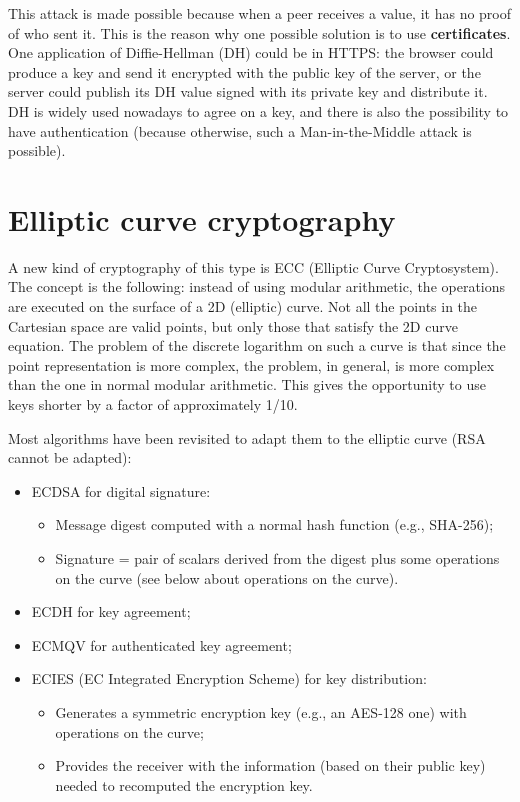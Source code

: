 This attack is made possible because when a peer receives a value, it has no proof of who sent it.
This is the reason why one possible solution is to use \textbf{certificates}. %
One application of Diffie-Hellman (DH) could be in HTTPS: the browser could produce a key and send it encrypted with the public key of the server, or the server could publish its DH value signed with its private key and distribute it.
DH is widely used nowadays to agree on a key, and there is also the possibility to have authentication (because otherwise, such a Man-in-the-Middle attack is possible).


\section{Elliptic curve cryptography}
A new kind of cryptography of this type is ECC (Elliptic Curve Cryptosystem). The concept is the following: instead of using modular arithmetic, the operations are executed on the surface of a 2D (elliptic) curve. Not all the points in the Cartesian space are valid points, but only those that satisfy the 2D curve equation. The problem of the discrete logarithm on such a curve is that since the point representation is more complex, the problem, in general, is more complex than the one in normal modular arithmetic. This gives the opportunity to use keys shorter by a factor of approximately 1/10.

Most algorithms have been revisited to adapt them to the elliptic curve (RSA cannot be adapted):
\begin{itemize}
    \item ECDSA for digital signature:
          \begin{itemize}
              \item Message digest computed with a normal hash function (e.g., SHA-256);
              \item Signature = pair of scalars derived from the digest plus some operations on the curve (see below about operations on the curve).
          \end{itemize}
    \item ECDH for key agreement;
    \item ECMQV for authenticated key agreement;
    \item ECIES (EC Integrated Encryption Scheme) for key distribution:
          \begin{itemize}
              \item Generates a symmetric encryption key (e.g., an AES-128 one) with operations on the curve;
              \item Provides the receiver with the information (based on their public key) needed to recomputed the encryption key.
          \end{itemize}
\end{itemize}


